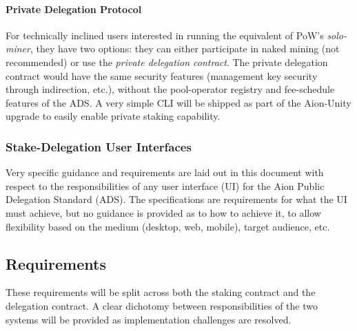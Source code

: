 \paragraph{Private Delegation Protocol}
For technically inclined users interested in running the equivalent of PoW's \textit{solo-miner}, they have two options: they can either participate in naked mining (not recommended) or use the \textit{private delegation contract}. The private delegation contract would have the same security features (management key security through indirection, etc.), without the pool-operator registry and fee-schedule features of the ADS. A very simple CLI will be shipped as part of the Aion-Unity upgrade to easily enable private staking capability. 

\subsubsection{Stake-Delegation User Interfaces}
Very specific guidance and requirements are laid out in this document with respect to the responsibilities of any user interface (UI) for the Aion Public Delegation Standard (ADS). The specifications are requirements for what the UI must achieve, but no guidance is provided as to how to achieve it, to allow flexibility based on the medium (desktop, web, mobile), target audience, etc. 

\subsection{Requirements}

These requirements will be split across both the staking contract and the delegation contract. A clear dichotomy between responsibilities of the two systems will be provided as implementation challenges are resolved. 

